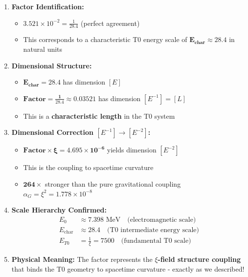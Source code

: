 	\begin{enumerate}
		\item \textbf{Factor Identification:}
		\begin{itemize}
			\item $3.521 \times 10^{-2} = \frac{1}{28.4}$ (perfect agreement)
			\item This corresponds to a characteristic T0 energy scale of $\mathbf{E_{\text{char}} \approx 28.4}$ in natural units
		\end{itemize}
		
		\item \textbf{Dimensional Structure:}
		\begin{itemize}
			\item $\mathbf{E_{\text{char}} = 28.4}$ has dimension $[E]$
			\item $\mathbf{\text{Factor} = \frac{1}{28.4} \approx 0.03521}$ has dimension $[E^{-1}] = [L]$
			\item This is a \textbf{characteristic length} in the T0 system
		\end{itemize}
		
		\item \textbf{Dimensional Correction $[E^{-1}] \rightarrow [E^{-2}]$:}
		\begin{itemize}
			\item $\mathbf{\text{Factor} \times \xi = 4.695 \times 10^{-6}}$ yields dimension $[E^{-2}]$
			\item This is the coupling to spacetime curvature
			\item $\mathbf{264\times}$ stronger than the pure gravitational coupling $\alpha_G = \xi^2 = 1.778 \times 10^{-8}$
		\end{itemize}
		
		\item \textbf{Scale Hierarchy Confirmed:}
		\begin{align}
			E_0 &\approx 7.398 \text{ MeV} \quad \text{(electromagnetic scale)} \\
			E_{\text{char}} &\approx 28.4 \quad \text{(T0 intermediate energy scale)} \\
			E_{T0} &= \frac{1}{\xi} = 7500 \quad \text{(fundamental T0 scale)}
		\end{align}
		
		\item \textbf{Physical Meaning:}
		The factor represents the \textbf{$\xi$-field structure coupling} that binds the T0 geometry to spacetime curvature - exactly as we described!
	\end{enumerate}
	
